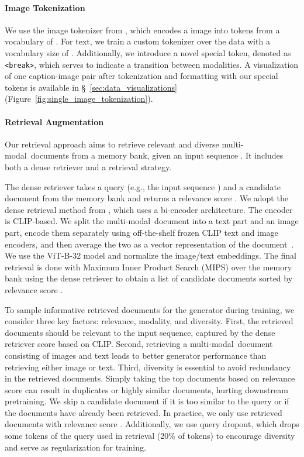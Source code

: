 \documentclass{article}
\newcommand{\mm}{multi-modal}
\begin{document}
\paragraph{Image Tokenization}
We use the image tokenizer from \citet{make_a_scene}, which encodes a  image into  tokens from a vocabulary of . For text, we train a custom tokenizer over the \citet{OPT} data with a vocabulary size of . Additionally, we introduce a novel special token, denoted as \texttt{<break>}, which serves to indicate a transition between modalities. A visualization of one caption-image pair after tokenization and formatting with our special tokens is available in \S~\ref{sec:data_visualizations}(Figure~\ref{fig:single_image_tokenization}).

\paragraph{Retrieval Augmentation}
Our retrieval approach aims to retrieve relevant and diverse \mm\ documents from a memory bank, given an input sequence \citep{RA_CM3}. It includes both a dense retriever and a retrieval strategy.

The dense retriever takes a query  (e.g., the input sequence ) and a candidate document  from the memory bank  and returns a relevance score . We adopt the dense retrieval method from \citet{dpr}, which uses a bi-encoder architecture. 
The encoder is CLIP-based. We split the \mm\ document into a text part and an image part, encode them separately using off-the-shelf frozen CLIP text and image encoders, and then average the two as a vector representation of the document~\citep{CLIP}. We use the ViT-B-32 model and normalize the image/text embeddings. 
The final retrieval is done with Maximum Inner Product Search (MIPS) over the memory bank using the dense retriever to obtain a list of candidate documents sorted by relevance score \citep{MIPS}.

To sample informative retrieved documents for the generator during training, we consider three key factors: relevance, modality, and diversity. First, the retrieved documents should be relevant to the input sequence, captured by the dense retriever score based on CLIP. Second, retrieving a \mm\ document consisting of images and text leads to better generator performance than retrieving either image or text. Third, diversity is essential to avoid redundancy in the retrieved documents. Simply taking the top  documents based on relevance score can result in duplicates or highly similar documents, hurting downstream pretraining. We skip a candidate document if it is too similar to the query or if the documents have already been retrieved. In practice, we only use retrieved documents with relevance score . Additionally, we use query dropout, which drops some tokens of the query used in retrieval (20\% of tokens) to encourage diversity and serve as regularization for training.
\end{document}
